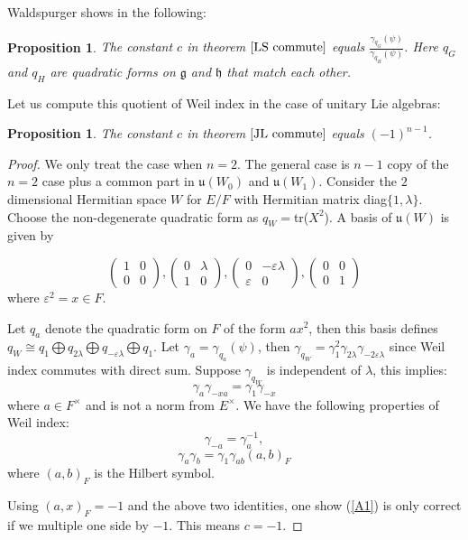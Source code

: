 \documentclass[11pt, oneside,reqno]{amsart}   	%
\newtheorem{proposition}[theorem]{Proposition}
\begin{document}
Waldspurger shows in \cite{Wa2} the following:
\begin{proposition}
The constant $c$ in theorem $\ref{LS commute}$ equals $\frac{\gamma_{q_G}(\psi)}{\gamma_{q_H}(\psi)}$. Here $q_G$ and $q_H$ are quadratic forms on $\mathfrak{g}$ and $\mathfrak{h}$ that match each other.
\end{proposition}

Let us compute this quotient of Weil index in the case of unitary Lie algebras:
\begin{proposition} \label{E1}
The constant $c$ in theorem $\ref{JL commute}$ equals $(-1)^{n-1}$.
\end{proposition}
\begin{proof}
We only treat the case when $n=2$. The general case is $n-1$ copy of the $n=2$ case plus a common part in $\mathfrak{u}(W_0)$ and $\mathfrak{u}(W_1)$. Consider the $2$ dimensional Hermitian space $W$ for $E/F$ with Hermitian matrix diag$\{1,\lambda\}$. Choose the non-degenerate quadratic form as $q_W=$tr($X^2$). A basis of $\mathfrak{u}(W)$ is given by 

$$ \begin{pmatrix}
    1 & 0  \\
    0 & 0 
  \end{pmatrix},
   \begin{pmatrix}
    0 & \lambda  \\
    1 & 0 
  \end{pmatrix},
   \begin{pmatrix}
    0 & -\varepsilon \lambda  \\
    \varepsilon & 0 
  \end{pmatrix},
   \begin{pmatrix}
    0 & 0  \\
    0 & 1 
  \end{pmatrix}$$  
where $\varepsilon^2=x \in F$.

Let $q_a$ denote the quadratic form on $F$ of the form $ax^2$, then this basis defines $q_W \cong q_1 \bigoplus q_{2\lambda} \bigoplus q_{-\varepsilon \lambda} \bigoplus q_1$. Let $\gamma_a=\gamma_{q_a}(\psi)$, then $\gamma_{q_W}=\gamma_1^2\gamma_{2\lambda} \gamma_{-2\varepsilon \lambda}$ since Weil index commutes with direct sum. Suppose $\gamma_{q_W}$ is independent of $\lambda$, this implies:
\begin{equation} \label{A1}
\gamma_{a}\gamma_{-xa}=\gamma_1\gamma_{-x}
\end{equation}
where $a \in F^\times$ and is not a norm from $E^\times$. We have the following properties of Weil index:
$$\gamma_{-a}=\gamma_{a}^{-1},$$
$$\gamma_a\gamma_b=\gamma_1\gamma_{ab}(a,b)_F$$
where $(a,b)_F$ is the Hilbert symbol.

Using $(a,x)_F=-1$ and the above two identities, one show (\ref{A1}) is only correct if we multiple one side by $-1$. This means $c=-1$.

  
\end{proof}
\end{document}
